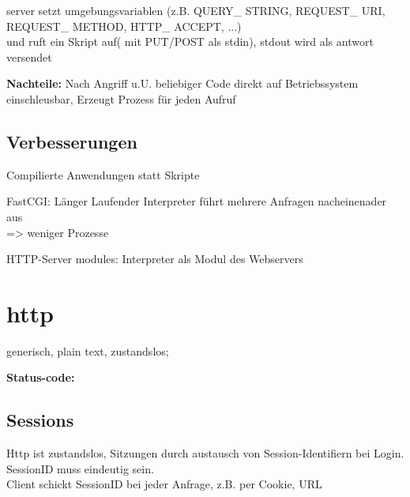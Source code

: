 server setzt umgebungsvariablen (z.B. QUERY\_ STRING, REQUEST\_ URI, REQUEST\_ METHOD, HTTP\_ ACCEPT, ...) \\ und ruft ein Skript auf( mit PUT/POST als stdin), stdout wird als antwort versendet

\textbf{Nachteile: }Nach Angriff u.U. beliebiger Code direkt auf Betriebssystem einschleusbar, Erzeugt Prozess für jeden Aufruf
\subsection{Verbesserungen}
Compilierte Anwendungen statt Skripte

FastCGI: Länger Laufender Interpreter führt mehrere Anfragen nacheinenader aus \\=> weniger Prozesse

HTTP-Server modules: Interpreter als Modul des Webservers
\section{http}
generisch, plain text, zustandslos;

\textbf{Status-code:}

\subsection{Sessions}
Http ist zustandslos, Sitzungen durch austausch von Session-Identifiern bei Login. \\
SessionID muss eindeutig sein. \\
Client schickt SessionID bei jeder Anfrage, z.B. per Cookie, URL


